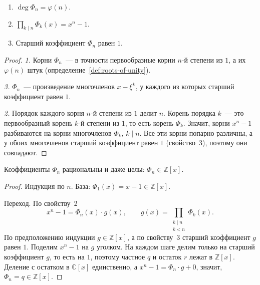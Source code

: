 \documentclass[12pt]{article}
\begin{document}
	\begin{properties}\label{prop:cyclotomic}
		\begin{enumerate}
			\item $\deg \Phi_n = \varphi(n)$.
			\item $\prod\limits_{k \mid n} \Phi_k(x) = x^n - 1$.
			\item Старший коэффициент $\Phi_n$ равен $1$.
		\end{enumerate}
	\end{properties}
	\begin{proof}
		\emph{1.} Корни $\Phi_n$~--- в точности первообразные корни $n$-й степени из $1$, а их $\varphi(n)$ штук (определение~\ref{def:roots-of-unity}).

		\emph{3.} $\Phi_n$~--- произведение многочленов $x - \xi^k$, у каждого из которых старший коэффициент равен $1$.

		\emph{2.} Порядок каждого корня $n$-й степени из $1$ делит $n$. Корень порядка $k$~--- это первообразный корень $k$-й степени из $1$, то есть корень $\Phi_k$. Значит, корни $x^n - 1$ разбиваются на корни многочленов $\Phi_k$, $k \mid n$. Все эти корни попарно различны, а у обоих многочленов старший коэффициент равен $1$ (свойство~3), поэтому они совпадают.
	\end{proof}

	\begin{corollary}\label{cor:cyclotomic-integer}
		Коэффициенты $\Phi_n$ рациональны и даже целы: $\Phi_n \in \mathbb{Z}[x]$.
	\end{corollary}
	\begin{proof}
		Индукция по $n$. База: $\Phi_1(x) = x - 1 \in \mathbb{Z}[x]$.

		Переход. По свойству~2
		\[
			x^n - 1 = \Phi_n(x) \cdot g(x), \qquad g(x) = \prod_{\substack{k \mid n \\ k < n}} \Phi_k(x).
		\]
		По предположению индукции $g \in \mathbb{Z}[x]$, а по свойству~3 старший коэффициент $g$ равен $1$. Поделим $x^n - 1$ на $g$ уголком. На каждом шаге делим только на старший коэффициент $g$, то есть на $1$, поэтому частное $q$ и остаток $r$ лежат в $\mathbb{Z}[x]$. Деление с остатком в $\mathbb{C}[x]$ единственно, а $x^n - 1 = \Phi_n \cdot g + 0$, значит, $\Phi_n = q \in \mathbb{Z}[x]$.
	\end{proof}
\end{document}
